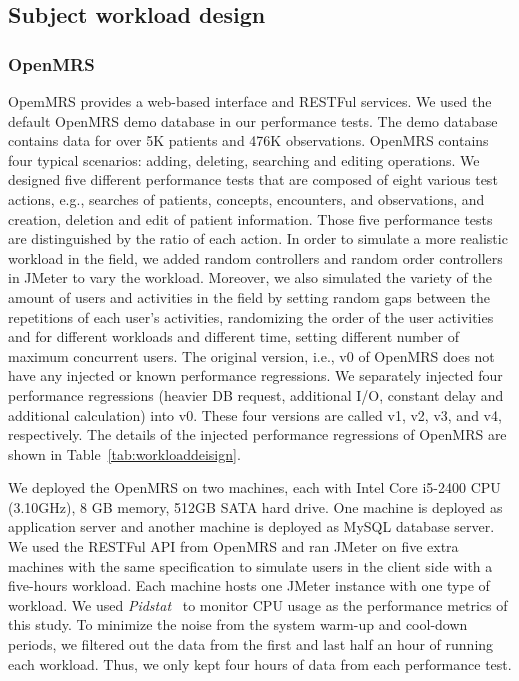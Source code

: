 \subsection{Subject workload design}
\subsubsection{OpenMRS}
OpemMRS provides a web-based interface and RESTFul services. We used the default OpenMRS demo database in our performance tests. The demo database contains data for over 5K patients and 476K observations. OpenMRS contains four typical scenarios: adding, deleting, searching and editing operations. We designed five different performance tests that are composed of eight various test actions, e.g., searches of patients, concepts, encounters, and observations, and creation, deletion and edit of patient information. Those five performance tests are distinguished by the ratio of each action. In order to simulate a more realistic workload in the field, we added random controllers and random order controllers in JMeter to vary the workload. Moreover, we also simulated the variety of the amount of users and activities in the field by setting random gaps between the repetitions of each user’s activities, randomizing the order of the user activities and for different workloads and different time, setting different number of maximum concurrent users. The original version, i.e., v0 of OpenMRS does not have any injected or known performance regressions. We separately injected four performance regressions (heavier DB request, additional I/O, constant delay and additional calculation) into v0. These four versions are called v1, v2, v3, and v4, respectively. The details of the injected performance regressions of OpenMRS are shown in Table~\ref{tab:workloaddeisign}.

We deployed the OpenMRS on two machines, each with Intel Core i5-2400 CPU (3.10GHz), 8 GB memory, 512GB SATA hard drive. One machine is deployed as application server and another machine is deployed as MySQL database server. We used the RESTFul API from OpenMRS and ran JMeter on five extra machines with the same specification to simulate users in the client side with a five-hours workload. Each machine hosts one JMeter instance with one type of workload. We used \emph{Pidstat}~\citep{pidstat} to monitor CPU usage as the performance metrics of this study.
To minimize the noise from the system warm-up and cool-down periods, we filtered out the data from the first and last half an hour of running each workload. Thus, we only kept four hours of data from each performance test.

